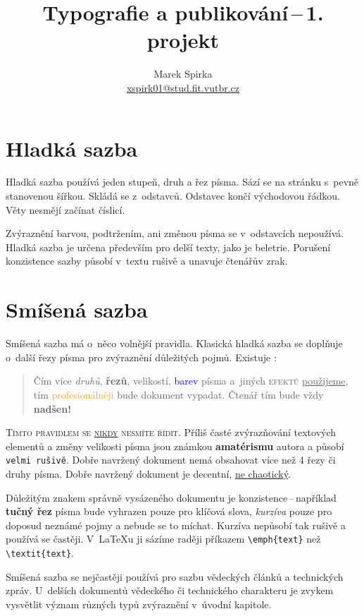 \documentclass[a4paper, twocolumn, 10pt]{article}
\title{Typografie a publikování\,--\,1. projekt}
\author{Marek Spirka\\ \href{mailto:xspirk01@stud.fit.vutbr.cz}{xspirk01@stud.fit.vutbr.cz}}
\date{}
\begin{document}
\maketitle

\section{Hladká sazba}
    Hladká sazba používá jeden stupeň, druh a řez písma. Sází
    se na stránku s~pevně stanovenou šířkou. Skládá se z~odstavců. Odstavec končí východovou řádkou. Věty nesmějí
    začínat číslicí.
    
    Zvýraznění barvou, podtržením, ani změnou písma se
    v~odstavcích nepoužívá. Hladká sazba je určena především
    pro delší texty, jako je beletrie. Porušení konzistence sazby
    působí v~textu rušivě a unavuje čtenářův zrak.

\section{Smíšená sazba}\label{sec:smisena_sazba}
    Smíšená sazba má o~něco volnější pravidla. Klasická hladká
    sazba se doplňuje o~další řezy písma pro zvýraznění důležitých pojmů. Existuje :


\begin{quotation}
    Čím více \emph{druhů}, \textbf{řezů}, {\huge velikostí}, \textcolor{blue}{barev}
    písma a~jiných \textsc{\color{red}efektů} \underline{použijeme}, tím \textcolor{orange}{profesionálněji} bude {\selectfont \Large{dokument}} vypadat. {\tiny Čtenář} tím bude vždy {\Huge \textbf{nadšen!}}
\end{quotation}

\textsc{Tímto pravidlem se \underline{nikdy} nesmíte řídit.} Příliš časté zvýrazňování textových elementů a změny {\tiny velikosti} písma jsou známkou \textbf{amatérismu} autora a působí \texttt{velmi rušivě}. Dobře navržený dokument nemá obsahovat více než 4 řezy či druhy písma. Dobře navržený dokument je decentní, \underline{ne chaotický}.
    
    Důležitým znakem správně vysázeného dokumentu je
    konzistence{\,--\,}například \textbf{tučný řez} písma bude vyhrazen
    pouze pro klíčová slova, \emph{kurzíva} pouze pro doposud neznámé pojmy a nebude se to míchat. Kurzíva nepůsobí
    tak rušivě a používá se častěji. V~\LaTeX u ji sázíme raději
    příkazem \verb|\emph{text}| než \verb|\textit{text}|.
    
    Smíšená sazba se nejčastěji používá pro sazbu vědeckých článků a technických zpráv. U~delších dokumentů
    vědeckého či technického charakteru je zvykem vysvětlit
    význam různých typů zvýraznění v~úvodní kapitole.
    
\end{document}

